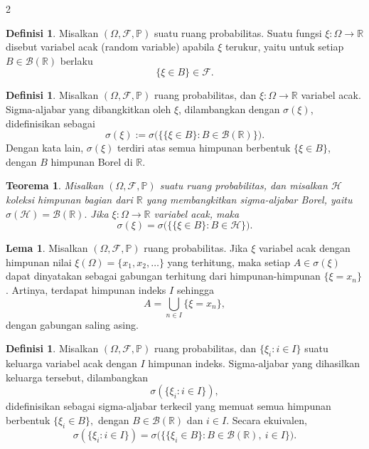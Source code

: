 \documentclass[a4paper,extrafontsizes, 9pt]{memoir}
\theoremstyle{definition}
\newtheorem{definisi}[kalstok]{Definisi}
\newtheorem{lemma}[kalstok]{Lema}
\theoremstyle{plain}
\newtheorem{teorema}[kalstok]{Teorema}
\theoremstyle{remark}
\begin{document}
\begin{multicols}{2}
  \begin{definisi}
    Misalkan $(\Omega,\mathcal{F},\mathbb{P})$ suatu ruang probabilitas.
    Suatu fungsi $\xi:\Omega\to\mathbb{R}$ disebut variabel acak (random variable) apabila $\xi$ terukur,
    yaitu untuk setiap $B\in\mathcal{B}(\mathbb{R})$ berlaku
    \[\{\xi\in B\}\in\mathcal{F}.\]
  \end{definisi}

  \begin{definisi}
    Misalkan $(\Omega,\mathcal{F},\mathbb{P})$ ruang probabilitas, dan $\xi:\Omega\to\mathbb{R}$ variabel acak.
    Sigma-aljabar yang dibangkitkan oleh $\xi$, dilambangkan dengan $\sigma(\xi)$, didefinisikan sebagai
    \[\sigma(\xi):=\sigma\bigl(\{\{\xi\in B\}:B\in\mathcal{B}(\mathbb{R})\}\bigr).\]
    Dengan kata lain, $\sigma(\xi)$ terdiri atas semua himpunan berbentuk $\{\xi\in B\}$,
    dengan $B$ himpunan Borel di $\mathbb{R}$.
  \end{definisi}

  \begin{teorema}
    Misalkan $(\Omega,\mathcal{F},\mathbb{P})$ suatu ruang probabilitas, dan misalkan $\mathcal{H}$
    koleksi himpunan bagian dari $\mathbb{R}$ yang membangkitkan sigma-aljabar Borel, yaitu
    $\sigma(\mathcal{H})=\mathcal{B}(\mathbb{R}).$
    Jika $\xi:\Omega\to\mathbb{R}$ variabel acak, maka
    \[\sigma(\xi)=\sigma\bigl(\{\{\xi\in B\}:B\in\mathcal{H}\}\bigr).\]
  \end{teorema}

  \begin{lemma}
    Misalkan $(\Omega,\mathcal{F},\mathbb{P})$ ruang probabilitas. Jika $\xi$ variabel acak dengan
    himpunan nilai $\xi(\Omega)=\{x_1,x_2,\ldots\}$ yang terhitung, maka setiap $A\in\sigma(\xi)$ dapat
    dinyatakan sebagai gabungan terhitung dari himpunan-himpunan $\{\xi=x_n\}$.
    Artinya, terdapat himpunan indeks $I$ sehingga
    \[A=\bigcup_{n\in I}\{\xi=x_n\},\]
    dengan gabungan saling asing.
  \end{lemma}

  \begin{definisi}
    Misalkan $(\Omega,\mathcal{F},\mathbb{P})$ ruang probabilitas, dan
    $\{\xi_i:i\in I\}$ suatu keluarga variabel acak dengan $I$ himpunan indeks.
    Sigma-aljabar yang dihasilkan keluarga tersebut, dilambangkan
    \[\sigma(\{\xi_i:i\in I\}),\]
    didefinisikan sebagai sigma-aljabar terkecil yang memuat semua himpunan berbentuk
    $\{\xi_i\in B\},$
    dengan $B\in\mathcal{B}(\mathbb{R})$ dan $i\in I$.
    Secara ekuivalen,
    \[\sigma(\{\xi_i:i\in I\})=\sigma\bigl(\{\{\xi_i\in B\}:B\in\mathcal{B}(\mathbb{R}),\ i\in I\}\bigr).\]
  \end{definisi}


\end{multicols}
\end{document}
